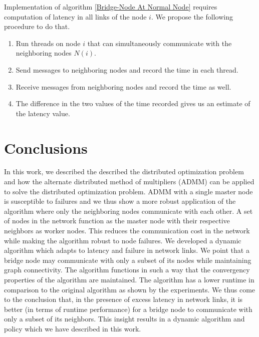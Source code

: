 \documentclass[letterpaper, 10 pt, conference]{ieeeconf}  %
\begin{document}
Implementation of algorithm \ref{Bridge-Node At Normal Node} requires computation of latency in all links of the node $i$. We propose the following procedure to do that.

\begin{enumerate}
\item Run threads on node $i$ that can simultaneously communicate with the neighboring nodes $N(i)$.
\item Send messages to neighboring nodes and record the time in each thread.
\item Receive messages from neighboring nodes and record the time as well.
\item The difference in the two values of the time recorded gives us an estimate of the latency value.
\end{enumerate}

\section{Conclusions}


In this work, we described the described the distributed optimization problem and how the alternate distributed method of multipliers (ADMM) can be applied to solve the distributed optimization problem. ADMM with a single master node is susceptible to failures and we thus show a more robust application of the algorithm where only the neighboring nodes communicate with each other. A set of nodes in the network function as the master node with their respective neighbors as worker nodes. This reduces the communication cost in the network while making the algorithm robust to node failures. We developed a dynamic algorithm which adapts to latency and failure in network links. We point that a bridge node may communicate with only a subset of its nodes while maintaining graph connectivity. The algorithm functions in such a way that the convergency properties of the algorithm are maintained. The algorithm has a lower runtime in comparison to the original algorithm as shown by the experiments. We thus come to the conclusion that, in the presence of excess latency in network links, it is better (in terms of runtime performance) for a bridge node to communicate with only a subset of its neighbors. This insight results in a dynamic algorithm and policy which we have described in this work.
\end{document}
